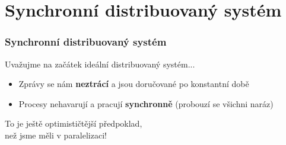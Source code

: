 \documentclass[usenames,dvipsnames,9pt]{beamer}
\begin{document}
\section{Synchronní distribuovaný systém}

\begin{frame}
\frametitle{Synchronní distribuovaný systém}

Uvažujme na začátek ideální distribuovaný systém...
\hspace{10pt}\begin{itemize}
  \item Zprávy se nám {\bf neztrácí} a jsou doručované po konstantní době
  \item Procesy nehavarují a pracují {\bf synchronně} (probouzí se všichni naráz)
\end{itemize}

\vspace{2em}\pause
\begin{center}
\Large To je ještě optimističtější předpoklad,\\ než jsme měli v paralelizaci!
\end{center}

\end{frame}
\end{document}
